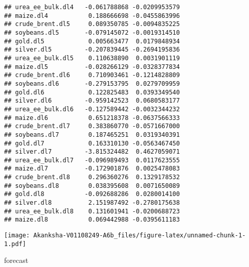 \documentclass[
]{article}
\newenvironment{Shaded}{\begin{snugshade}}{\end{snugshade}}
\newcommand{\NormalTok}[1]{#1}
\begin{document}
\begin{verbatim}
## urea_ee_bulk.dl4   -0.061788868 -0.0209953579
## maize.dl4           0.188666698 -0.0455863996
## crude_brent.dl5     0.089350785 -0.0094835225
## soybeans.dl5       -0.079145072 -0.0019314510
## gold.dl5            0.005663477  0.0179848934
## silver.dl5         -0.207839445 -0.2694195836
## urea_ee_bulk.dl5    0.110638890  0.0031901119
## maize.dl5          -0.028266129 -0.0328377834
## crude_brent.dl6     0.710903461 -0.1214828809
## soybeans.dl6       -0.279153795  0.0279709959
## gold.dl6            0.122825483  0.0393349540
## silver.dl6         -0.959142523  0.0680583177
## urea_ee_bulk.dl6   -0.127589442 -0.0032344232
## maize.dl6           0.651218378 -0.0637566333
## crude_brent.dl7     0.383860770 -0.0571667000
## soybeans.dl7        0.187465251  0.0319340391
## gold.dl7            0.163310130 -0.0563467450
## silver.dl7         -3.815324482  0.4627059071
## urea_ee_bulk.dl7   -0.096989493  0.0117623555
## maize.dl7          -0.172901876  0.0025478083
## crude_brent.dl8     0.296360276  0.1329178532
## soybeans.dl8        0.038395608  0.0071650089
## gold.dl8           -0.092688286  0.0280014100
## silver.dl8          2.151987492 -0.2780175638
## urea_ee_bulk.dl8    0.131601941 -0.0200688723
## maize.dl8           0.069442988 -0.0395611183
\end{verbatim}

\texttt{[image: Akanksha-V01108249-A6b\_files/figure-latex/unnamed-chunk-1-1.pdf]}

\begin{Shaded}
\begin{Highlighting}[]
\NormalTok{forecast}
\end{Highlighting}
\end{Shaded}
\end{document}
